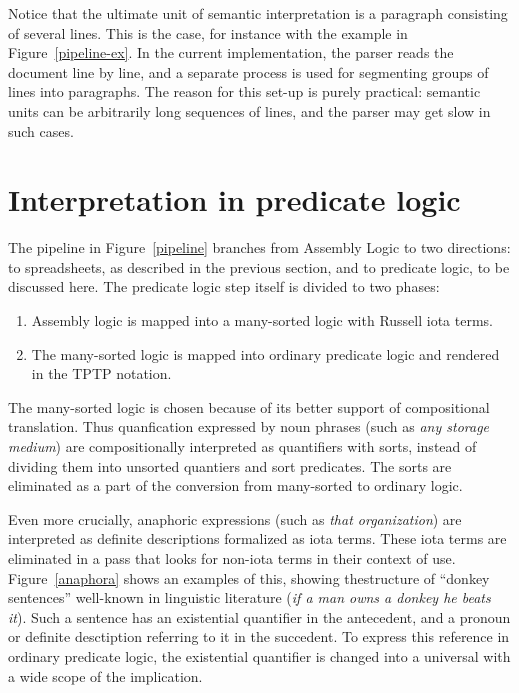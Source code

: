 \documentclass{IOS-Book-Article}
\begin{document}
Notice that the ultimate unit of semantic interpretation is a paragraph consisting of several lines.
This is the case, for instance with the example in Figure~\ref{pipeline-ex}.
In the current implementation, the parser reads the document line by line, and a separate process is used for segmenting groups of lines into paragraphs.
The reason for this set-up is purely practical: semantic units can be arbitrarily long sequences of lines, and the parser may get slow in such cases.




\section{Interpretation in predicate logic}

The pipeline in Figure~\ref{pipeline} branches from Assembly Logic to two directions: to spreadsheets, as described in the previous section, and to predicate logic, to be discussed here.
The predicate logic step itself is divided to two phases:
\begin{enumerate}
\item Assembly logic is mapped into a many-sorted logic with Russell iota terms.
\item The many-sorted logic is mapped into ordinary predicate logic and rendered in the TPTP notation.
\end{enumerate}
The many-sorted logic is chosen because of its better support of compositional translation.
Thus quanfication expressed by noun phrases (such as \textit{any storage medium}) are compositionally interpreted as quantifiers with sorts, instead of dividing them into unsorted quantiers and sort predicates.
The sorts are eliminated as a part of the conversion from many-sorted to ordinary logic.

Even more crucially, anaphoric expressions (such as \textit{that organization}) are interpreted as definite descriptions formalized as iota terms.
These iota terms are eliminated in a pass that looks for non-iota terms in their context of use.
Figure~\ref{anaphora} shows an examples of this, showing thestructure of ``donkey sentences'' well-known in linguistic literature (\textit{if a man owns a donkey he beats it}).
Such a sentence has an existential quantifier in the antecedent, and a pronoun or definite desctiption referring to it in the succedent.
To express this reference in ordinary predicate logic, the existential quantifier is changed into a universal with a wide scope of the implication.
\end{document}
